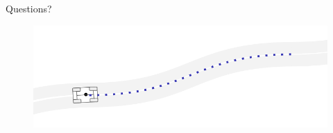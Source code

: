 \documentclass{beamer}
\begin{document}
\begin{frame}
\vspace{8.0em}
\begin{center}
\Huge{Questions?}\normalsize
\vspace{1.0em}
\begin{figure}[b!]
	\centering
	\includegraphics[width=1.0\linewidth]{figures/end_slide.png}
\end{figure}
\end{center}
\end{frame}
	









	
\end{document}

